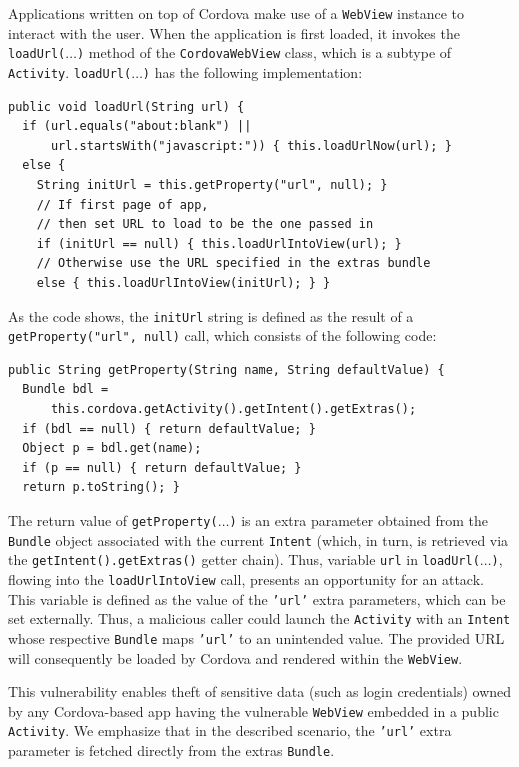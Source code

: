Applications written on top of Cordova make use of a {\tt WebView} instance to interact with the user. When the application is first loaded, it invokes the {\tt loadUrl($\ldots$)} method of the {\tt CordovaWebView} class, which is a subtype of {\tt Activity}. {\tt loadUrl($\ldots$)} has the following implementation:
\begin{small}
\begin{lstlisting}[showstringspaces=false]
public void loadUrl(String url) {
  if (url.equals("about:blank") || 
      url.startsWith("javascript:")) { this.loadUrlNow(url); }
  else {
    String initUrl = this.getProperty("url", null); }
    // If first page of app, 
    // then set URL to load to be the one passed in
    if (initUrl == null) { this.loadUrlIntoView(url); }
    // Otherwise use the URL specified in the extras bundle
    else { this.loadUrlIntoView(initUrl); } }
\end{lstlisting}
\end{small}
As the code shows, the {\tt initUrl} string is defined as the result of a  {\tt getProperty("url", null)} call, which consists of the following code:
\begin{small}
\begin{lstlisting}[showstringspaces=false]
public String getProperty(String name, String defaultValue) {
  Bundle bdl = 
      this.cordova.getActivity().getIntent().getExtras();
  if (bdl == null) { return defaultValue; }
  Object p = bdl.get(name);
  if (p == null) { return defaultValue; }
  return p.toString(); }
\end{lstlisting}
\end{small}
The return value of {\tt getProperty($\ldots$)} is an extra parameter obtained from the {\tt Bundle} object associated with the current {\tt Intent} (which, in turn, is retrieved via the {\tt getIntent().getExtras()} getter chain). Thus, variable {\tt url} in {\tt loadUrl($\ldots$)}, flowing into the {\tt loadUrlIntoView} call, presents an opportunity for an attack. This variable is defined
as the value of the {\tt 'url'} extra parameters, which can be set externally.  
Thus, a malicious caller could launch the {\tt Activity} with an {\tt Intent} whose respective {\tt Bundle} maps {\tt 'url'} to an unintended value. The provided URL will consequently be loaded by Cordova and rendered within the {\tt WebView}.

This vulnerability enables theft of sensitive data (such as login credentials) owned by any Cordova-based app having the vulnerable {\tt WebView} embedded in a public {\tt Activity}.
We emphasize that in the described scenario, the {\tt 'url'} extra parameter is fetched directly from the extras {\tt Bundle}. 

